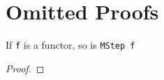 \appendix 

\section{Omitted Proofs}

\begin{lem}
	If \verb|f| is a functor, so is \verb|MStep f|
\end{lem}
\begin{thm}
	
\end{thm}
\begin{proof}
	
\end{proof}

